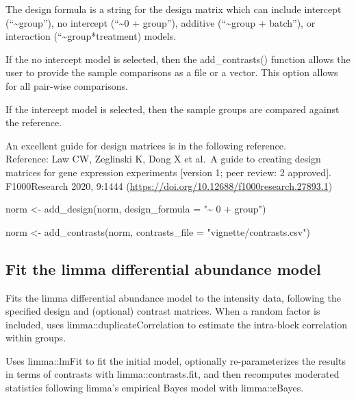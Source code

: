 \documentclass[
]{article}
\newenvironment{Shaded}{\begin{snugshade}}{\end{snugshade}}
\newcommand{\AttributeTok}[1]{\textcolor[rgb]{0.77,0.63,0.00}{#1}}
\newcommand{\FunctionTok}[1]{\textcolor[rgb]{0.00,0.00,0.00}{#1}}
\newcommand{\NormalTok}[1]{#1}
\newcommand{\OtherTok}[1]{\textcolor[rgb]{0.56,0.35,0.01}{#1}}
\newcommand{\StringTok}[1]{\textcolor[rgb]{0.31,0.60,0.02}{#1}}
\begin{document}
The design formula is a string for the design matrix which can include
intercept (``\textasciitilde group''), no intercept (``\textasciitilde0
+ group''), additive (``\textasciitilde group + batch''), or interaction
(``\textasciitilde group*treatment) models.

If the no intercept model is selected, then the add\_contrasts()
function allows the user to provide the sample comparisons as a file or
a vector. This option allows for all pair-wise comparisons.

If the intercept model is selected, then the sample groups are compared
against the reference.

An excellent guide for design matrices is in the following reference.\\
Reference: Law CW, Zeglinski K, Dong X et al.~A guide to creating design
matrices for gene expression experiments {[}version 1; peer review: 2
approved{]}. F1000Research 2020, 9:1444
(\url{https://doi.org/10.12688/f1000research.27893.1})

\begin{Shaded}
\begin{Highlighting}[]
\NormalTok{norm }\OtherTok{\textless{}{-}} \FunctionTok{add\_design}\NormalTok{(norm,}
                   \AttributeTok{design\_formula =} \StringTok{"\textasciitilde{} 0 + group"}\NormalTok{)}


\NormalTok{norm }\OtherTok{\textless{}{-}} \FunctionTok{add\_contrasts}\NormalTok{(norm,}
                      \AttributeTok{contrasts\_file =} \StringTok{"vignette/contrasts.csv"}\NormalTok{)}
\end{Highlighting}
\end{Shaded}

\hypertarget{fit-the-limma-differential-abundance-model}{%
\subsection{Fit the limma differential abundance
model}\label{fit-the-limma-differential-abundance-model}}

Fits the limma differential abundance model to the intensity data,
following the specified design and (optional) contrast matrices. When a
random factor is included, uses limma::duplicateCorrelation to estimate
the intra-block correlation within groups.

Uses limma::lmFit to fit the initial model, optionally re-parameterizes
the results in terms of contrasts with limma::contrasts.fit, and then
recomputes moderated statistics following limma's empirical Bayes model
with limma::eBayes.
\end{document}
